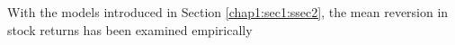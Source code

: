 With the models introduced in Section \ref{chap1:sec1:ssec2}, the mean reversion in stock returns
has been examined empirically 